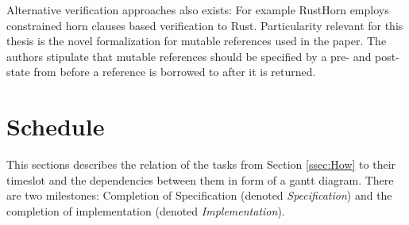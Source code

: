 \documentclass[11pt]{article}
\begin{document}
Alternative verification approaches also exists: For example RustHorn\cite{matsushita_rusthorn_2020} employs constrained horn clauses based verification to Rust. Particularity relevant for this thesis is the novel formalization for mutable references used in the paper. The authors stipulate that mutable references should be specified by a pre- and post-state from before a reference is borrowed to after it is returned.

\section{Schedule} \label{sec:schedule}

This sections describes the relation of the tasks from Section \ref{ssec:How} to their timeslot and the dependencies between them in form of a gantt diagram. There are two milestones: Completion of Specification (denoted \textit{Specification}) and the completion of implementation (denoted \textit{Implementation}).





\end{document}
